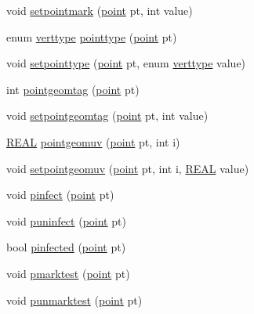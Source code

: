 \begin{DoxyCompactItemize}
\item 
void \hyperlink{classtetgenmesh_ad2cce627693ef75e8fc956b0e0743800}{setpointmark} (\hyperlink{classtetgenmesh_ace3fb4f80389185b7c9b18ab69a3dea2}{point} pt, int value)
\item 
enum \hyperlink{classtetgenmesh_ad0458f823a5eef2de89c7fae067aa2ac}{verttype} \hyperlink{classtetgenmesh_a87204594ee11bb38e68e0381e6e04b6c}{pointtype} (\hyperlink{classtetgenmesh_ace3fb4f80389185b7c9b18ab69a3dea2}{point} pt)
\item 
void \hyperlink{classtetgenmesh_a036752e66b8fcce81d7f983842fcf8d3}{setpointtype} (\hyperlink{classtetgenmesh_ace3fb4f80389185b7c9b18ab69a3dea2}{point} pt, enum \hyperlink{classtetgenmesh_ad0458f823a5eef2de89c7fae067aa2ac}{verttype} value)
\item 
int \hyperlink{classtetgenmesh_a5f3d4b9b05181247bc518d6c0b0ac790}{pointgeomtag} (\hyperlink{classtetgenmesh_ace3fb4f80389185b7c9b18ab69a3dea2}{point} pt)
\item 
void \hyperlink{classtetgenmesh_ae61f5def2617ad2cedf2bbc5f6a59c02}{setpointgeomtag} (\hyperlink{classtetgenmesh_ace3fb4f80389185b7c9b18ab69a3dea2}{point} pt, int value)
\item 
\hyperlink{tetgen_8h_a4b654506f18b8bfd61ad2a29a7e38c25}{R\-E\-A\-L} \hyperlink{classtetgenmesh_ad9b42ae25336d5ecb21577fe072a54a0}{pointgeomuv} (\hyperlink{classtetgenmesh_ace3fb4f80389185b7c9b18ab69a3dea2}{point} pt, int i)
\item 
void \hyperlink{classtetgenmesh_a9bf2266e82ad2f2faf77f6b502e8ba1d}{setpointgeomuv} (\hyperlink{classtetgenmesh_ace3fb4f80389185b7c9b18ab69a3dea2}{point} pt, int i, \hyperlink{tetgen_8h_a4b654506f18b8bfd61ad2a29a7e38c25}{R\-E\-A\-L} value)
\item 
void \hyperlink{classtetgenmesh_a3da09b1723336c0d9e82677f8f30c965}{pinfect} (\hyperlink{classtetgenmesh_ace3fb4f80389185b7c9b18ab69a3dea2}{point} pt)
\item 
void \hyperlink{classtetgenmesh_a6220e341248cd83ab6ee1c0d71e4d160}{puninfect} (\hyperlink{classtetgenmesh_ace3fb4f80389185b7c9b18ab69a3dea2}{point} pt)
\item 
bool \hyperlink{classtetgenmesh_acc0db186d69dcdf785b49d6e709fed7b}{pinfected} (\hyperlink{classtetgenmesh_ace3fb4f80389185b7c9b18ab69a3dea2}{point} pt)
\item 
void \hyperlink{classtetgenmesh_a7f5f5b3321dcc8cb4f7852fd63688043}{pmarktest} (\hyperlink{classtetgenmesh_ace3fb4f80389185b7c9b18ab69a3dea2}{point} pt)
\item 
void \hyperlink{classtetgenmesh_af01c7d8e906de52fb5e8622d5a8dfb15}{punmarktest} (\hyperlink{classtetgenmesh_ace3fb4f80389185b7c9b18ab69a3dea2}{point} pt)

\end{DoxyCompactItemize}
